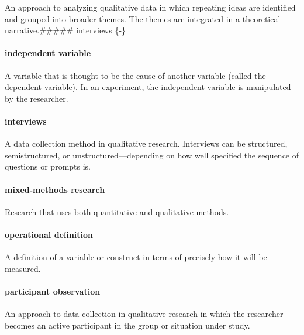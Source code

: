 \documentclass[
]{krantz}
\begin{document}
An approach to analyzing qualitative data in which repeating ideas are identified and grouped into broader themes. The themes are integrated in a theoretical narrative.\#\#\#\#\# interviews \{-\}

\paragraph*{independent variable}\label{independent-variable}

A variable that is thought to be the cause of another variable (called the dependent variable). In an experiment, the independent variable is manipulated by the researcher.

\paragraph*{interviews}\label{interviews}

A data collection method in qualitative research. Interviews can be structured, semistructured, or unstructured---depending on how well specified the sequence of questions or prompts is.

\paragraph*{mixed-methods research}\label{mixed-methods-research}

Research that uses both quantitative and qualitative methods.

\paragraph*{operational definition}\label{operational-definition}

A definition of a variable or construct in terms of precisely how it will be measured.

\paragraph*{participant observation}\label{participant-observation}

An approach to data collection in qualitative research in which the researcher becomes an active participant in the group or situation under study.
\end{document}
